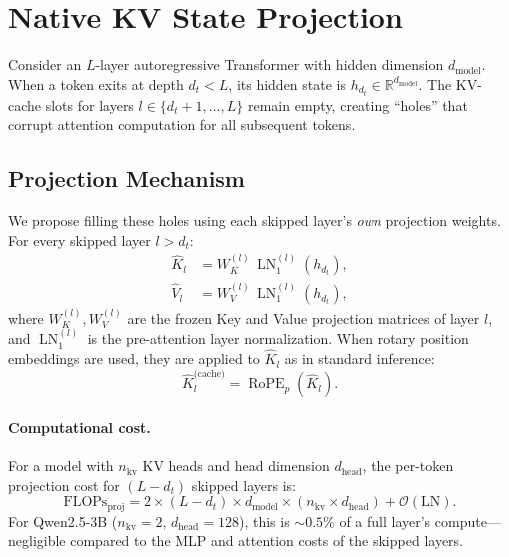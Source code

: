 \documentclass{article}
\newcommand{\dt}{d_t}
\newcommand{\Khat}{\hat{K}}
\newcommand{\Vhat}{\hat{V}}
\DeclareMathOperator{\LN}{LN}
\DeclareMathOperator{\RoPE}{RoPE}
\begin{document}
\section{Native KV State Projection}
\label{sec:method}

Consider an $L$-layer autoregressive Transformer with hidden dimension $d_{\text{model}}$. When a token exits at depth $\dt < L$, its hidden state is $h_{\dt} \in \mathbb{R}^{d_{\text{model}}}$. The KV-cache slots for layers $l \in \{\dt{+}1, \ldots, L\}$ remain empty, creating ``holes'' that corrupt attention computation for all subsequent tokens.

\subsection{Projection Mechanism}

We propose filling these holes using each skipped layer's \emph{own} projection weights. For every skipped layer $l > \dt$:
\begin{align}
    \Khat_l &= W_K^{(l)}\, \LN_1^{(l)}(h_{\dt}), \label{eq:kproj} \\
    \Vhat_l &= W_V^{(l)}\, \LN_1^{(l)}(h_{\dt}), \label{eq:vproj}
\end{align}
where $W_K^{(l)}, W_V^{(l)}$ are the frozen Key and Value projection matrices of layer $l$, and $\LN_1^{(l)}$ is the pre-attention layer normalization. When rotary position embeddings are used, they are applied to $\Khat_l$ as in standard inference:
\begin{equation}
    \Khat_l^{\text{(cache)}} = \RoPE_p\!\left(\Khat_l\right).
\end{equation}

\paragraph{Computational cost.}
For a model with $n_{\text{kv}}$ KV heads and head dimension $d_{\text{head}}$, the per-token projection cost for $(L - \dt)$ skipped layers is:
\begin{equation}
    \text{FLOPs}_{\text{proj}} = 2 \times (L - \dt) \times d_{\text{model}} \times (n_{\text{kv}} \times d_{\text{head}}) + \mathcal{O}(\text{LN}).
\end{equation}
For Qwen2.5-3B ($n_{\text{kv}} = 2$, $d_{\text{head}} = 128$), this is $\sim 0.5\%$ of a full layer's compute---negligible compared to the MLP and attention costs of the skipped layers.
\end{document}
